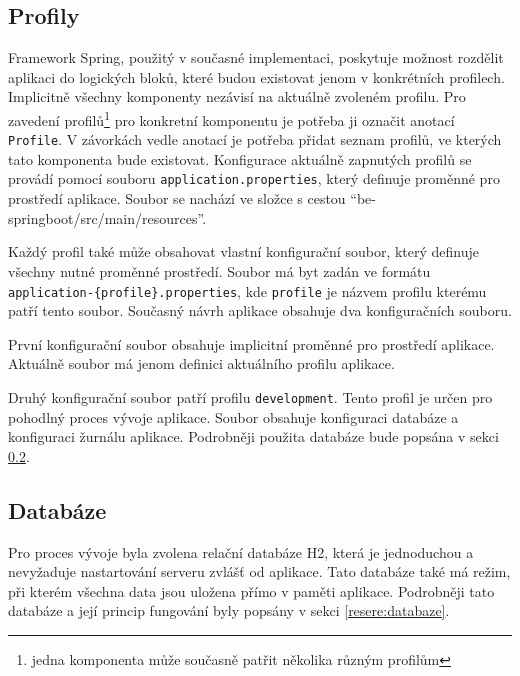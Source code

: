    \subsection{Profily}\label{analyza:soucasnaImplementace:profily}
        Framework Spring, použitý v současné implementaci, poskytuje možnost rozdělit aplikaci do logických bloků, které budou existovat jenom v konkrétních profilech\cite{spring-profile}. Implicitně všechny komponenty nezávisí na aktuálně zvoleném profilu. Pro zavedení profilů\footnote{jedna komponenta může současně patřit několika různým profilům} pro konkretní komponentu je potřeba ji označit anotací \texttt{Profile}. V závorkách vedle anotací je potřeba přidat seznam profilů, ve kterých tato komponenta bude existovat. Konfigurace aktuálně zapnutých profilů se provádí pomocí souboru \texttt{application.properties}, který definuje proměnné pro prostředí aplikace. Soubor se nachází ve složce s cestou \enquote{be-springboot/src/main/resources}.
    
        Každý profil také může obsahovat vlastní konfigurační soubor, který definuje všechny nutné proměnné prostředí. Soubor má byt zadán ve formátu \texttt{application-\{profile\}.properties}, kde \texttt{profile} je názvem profilu kterému patří tento soubor. Současný návrh aplikace obsahuje dva konfiguračních souboru.
    
        První konfigurační soubor obsahuje implicitní proměnné pro prostředí aplikace. Aktuálně soubor má jenom definici aktuálního profilu aplikace. 
    
        Druhý konfigurační soubor patří profilu \texttt{development}. Tento profil je určen pro pohodlný proces vývoje aplikace. Soubor obsahuje konfiguraci databáze a konfiguraci žurnálu aplikace. Podrobněji použita databáze bude popsána v sekci \ref{analyza:soucasnaImplementace:databaze}.
        
    \subsection{Databáze}\label{analyza:soucasnaImplementace:databaze}
        Pro proces vývoje byla zvolena relační databáze H2, která je jednoduchou a nevyžaduje nastartování serveru zvlášť od aplikace. Tato databáze také má režim, při kterém všechna data jsou uložena přímo v paměti aplikace. Podrobněji tato databáze a její princip fungování byly popsány v sekci \ref{resere:databaze}.
    
